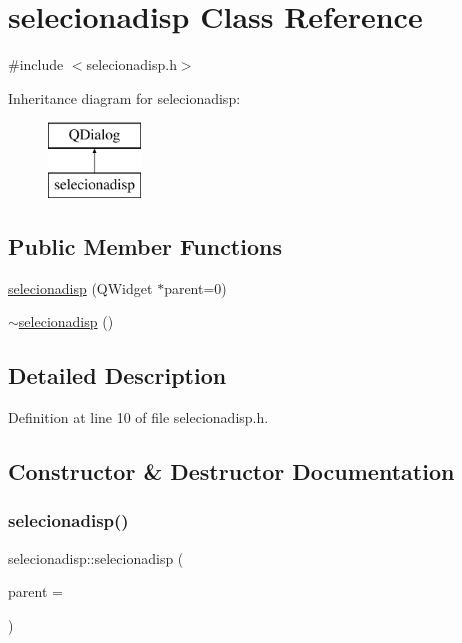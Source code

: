 \hypertarget{classselecionadisp}{}\section{selecionadisp Class Reference}
\label{classselecionadisp}


{\ttfamily \#include $<$selecionadisp.\+h$>$}

Inheritance diagram for selecionadisp\+:\begin{figure}[H]
\begin{center}
\leavevmode
\includegraphics[height=2.000000cm]{classselecionadisp}
\end{center}
\end{figure}
\subsection*{Public Member Functions}
\begin{DoxyCompactItemize}
\item 
\hyperlink{classselecionadisp_a23cbf45ded7e90e20f7d3ea8679f856a}{selecionadisp} (Q\+Widget $\ast$parent=0)
\item 
\hyperlink{classselecionadisp_aad8dcaadb86038322f173c9b9203916e}{$\sim$selecionadisp} ()
\end{DoxyCompactItemize}


\subsection{Detailed Description}


Definition at line 10 of file selecionadisp.\+h.



\subsection{Constructor \& Destructor Documentation}
\hypertarget{classselecionadisp_a23cbf45ded7e90e20f7d3ea8679f856a}{}\label{classselecionadisp_a23cbf45ded7e90e20f7d3ea8679f856a} 
\subsubsection{\texorpdfstring{selecionadisp()}{selecionadisp()}}
{\footnotesize\ttfamily selecionadisp\+::selecionadisp (\begin{DoxyParamCaption}\item[{Q\+Widget $\ast$}]{parent = {} }\end{DoxyParamCaption})\hspace{0.3cm}{\ttfamily [explicit]}}



